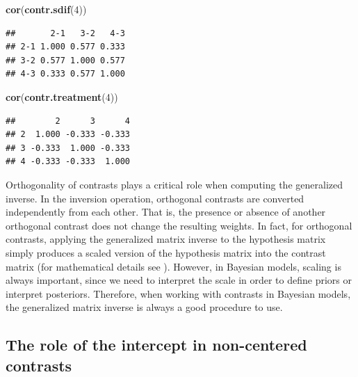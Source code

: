 \documentclass[12pt,]{krantz}
\newenvironment{Shaded}{\begin{snugshade}}{\end{snugshade}}
\newcommand{\DecValTok}[1]{\textcolor[rgb]{0.00,0.00,0.81}{#1}}
\newcommand{\KeywordTok}[1]{\textcolor[rgb]{0.13,0.29,0.53}{\textbf{#1}}}
\newcommand{\NormalTok}[1]{#1}
\theoremstyle{definition}
\theoremstyle{definition}
\theoremstyle{definition}
\theoremstyle{remark}
\begin{document}
\begin{Shaded}
\begin{Highlighting}[]
\KeywordTok{cor}\NormalTok{(}\KeywordTok{contr.sdif}\NormalTok{(}\DecValTok{4}\NormalTok{))}
\end{Highlighting}
\end{Shaded}

\begin{verbatim}
##       2-1   3-2   4-3
## 2-1 1.000 0.577 0.333
## 3-2 0.577 1.000 0.577
## 4-3 0.333 0.577 1.000
\end{verbatim}

\begin{Shaded}
\begin{Highlighting}[]
\KeywordTok{cor}\NormalTok{(}\KeywordTok{contr.treatment}\NormalTok{(}\DecValTok{4}\NormalTok{))}
\end{Highlighting}
\end{Shaded}

\begin{verbatim}
##        2      3      4
## 2  1.000 -0.333 -0.333
## 3 -0.333  1.000 -0.333
## 4 -0.333 -0.333  1.000
\end{verbatim}

Orthogonality of contrasts plays a critical role when computing the generalized inverse. In the inversion operation, orthogonal contrasts are converted independently from each other. That is, the presence or absence of another orthogonal contrast does not change the resulting weights. In fact, for orthogonal contrasts, applying the generalized matrix inverse to the hypothesis matrix simply produces a scaled version of the hypothesis matrix into the contrast matrix (for mathematical details see \citet{schad2020capitalize}). However, in Bayesian models, scaling is always important, since we need to interpret the scale in order to define priors or interpret posteriors. Therefore, when working with contrasts in Bayesian models, the generalized matrix inverse is always a good procedure to use.

\hypertarget{the-role-of-the-intercept-in-non-centered-contrasts}{%
\subsection{The role of the intercept in non-centered contrasts}\label{the-role-of-the-intercept-in-non-centered-contrasts}}
\end{document}

